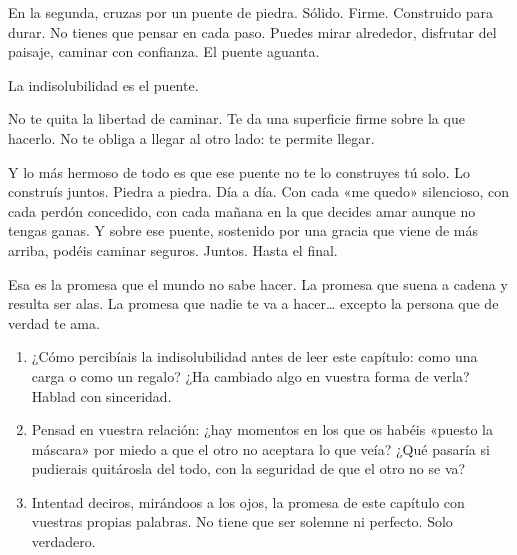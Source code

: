 En la segunda, cruzas por un puente de piedra. Sólido. Firme. Construido para durar. No tienes que pensar en cada paso. Puedes mirar alrededor, disfrutar del paisaje, caminar con confianza. El puente aguanta.

La indisolubilidad es el puente.

No te quita la libertad de caminar. Te da una superficie firme sobre la que hacerlo. No te obliga a llegar al otro lado: te permite llegar.

Y lo más hermoso de todo es que ese puente no te lo construyes tú solo. Lo construís juntos. Piedra a piedra. Día a día. Con cada «me quedo» silencioso, con cada perdón concedido, con cada mañana en la que decides amar aunque no tengas ganas. Y sobre ese puente, sostenido por una gracia que viene de más arriba, podéis caminar seguros. Juntos. Hasta el final.

Esa es la promesa que el mundo no sabe hacer. La promesa que suena a cadena y resulta ser alas. La promesa que nadie te va a hacer\ldots{} excepto la persona que de verdad te ama.

\paracaminar

\begin{enumerate}
  \item ¿Cómo percibíais la indisolubilidad antes de leer este capítulo: como una carga o como un regalo? ¿Ha cambiado algo en vuestra forma de verla? Hablad con sinceridad.

  \item Pensad en vuestra relación: ¿hay momentos en los que os habéis «puesto la máscara» por miedo a que el otro no aceptara lo que veía? ¿Qué pasaría si pudierais quitárosla del todo, con la seguridad de que el otro no se va?

  \item Intentad deciros, mirándoos a los ojos, la promesa de este capítulo con vuestras propias palabras. No tiene que ser solemne ni perfecto. Solo verdadero.
\end{enumerate}

